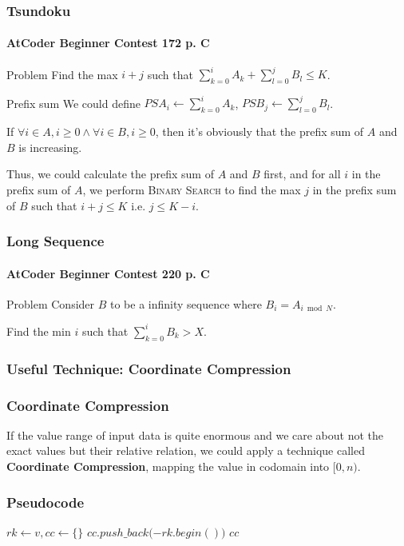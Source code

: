 \documentclass{beamer}
\begin{document}
\frame
{
	\frametitle{Tsundoku}
	\framesubtitle{AtCoder Beginner Contest 172 p. C}
	
	\begin{block}{Problem}
		Find the max $i+j$ such that $\sum_{k=0}^iA_k + \sum_{l=0}^jB_l \leq K$.
	\end{block}
	
	\pause
	
	\begin{block}{Prefix sum}
		We could define $PSA_i\gets\sum_{k=0}^iA_k$, $PSB_j\gets\sum_{l=0}^jB_l$.\pause
		
		If $\forall i\in A, i\geq 0\land\forall i\in B, i\geq 0$, then it's obviously that the prefix sum of $A$ and $B$ is increasing.\pause
	\end{block}
	
	Thus, we could calculate the prefix sum of $A$ and $B$ first, and for all $i$ in the prefix sum of $A$, we perform \textsc{Binary Search} to find the max $j$ in the prefix sum of $B$ such that $i+j\leq K$ i.e. $j\leq K-i$.
}

\frame
{
	\frametitle{Long Sequence}
	\framesubtitle{AtCoder Beginner Contest 220 p. C}
	
	\begin{block}{Problem}
		Consider $B$ to be a infinity sequence where $B_i = A_{i\bmod N}$.
		
		Find the min $i$ such that $\sum_{k=0}^iB_k > X$.
	\end{block}
}

\subsubsection{Useful Technique: Coordinate Compression}

\frame
{
	\frametitle{Coordinate Compression}
	
	If the value range of input data is quite enormous and we care about not the exact values but their relative relation, we could apply a technique called \textbf{Coordinate Compression}, mapping the value in codomain into $[0, n)$.
}

\frame
{
	\frametitle{Pseudocode}
	
	\begin{algorithmic}
		\small
    		\State$rk\gets v, cc\gets \{\}$
			\State{}
			\State{}
				\State$cc.push\_back($$ - rk.begin())$
			\EndFor
			\State\Return$cc$
        \EndProcedure
	\end{algorithmic}
}
\end{document}
